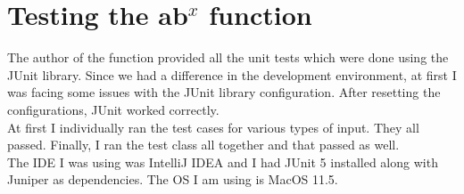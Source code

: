 \documentclass[paper=a4, fontsize=11pt,twoside]{scrartcl}	%
\begin{document}
    \section{Testing the ab$^x$ function}
    The author of the function provided all the unit tests which were done using the JUnit library. Since we had a difference in the development environment, at first I was facing some issues with the JUnit library configuration. After resetting the configurations, JUnit worked correctly. \\
    At first I individually ran the test cases for various types of input. They all passed. Finally, I ran the test class all together and that passed as well.\\
    The IDE I was using was IntelliJ IDEA and I had JUnit 5 installed along with Juniper as dependencies. The OS I am using is MacOS 11.5.
    
    
    

\end{document}
